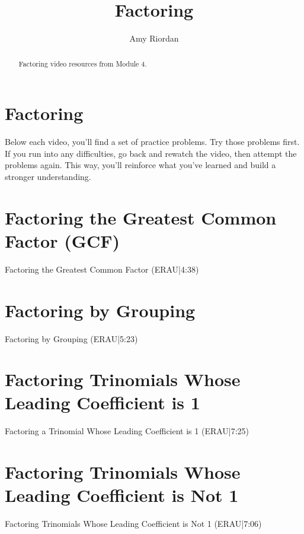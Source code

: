 \documentclass{ximera}
\title{Factoring}
\author{Amy Riordan}
\begin{document}
\begin{abstract}
Factoring video resources from Module 4.
\end{abstract}
\maketitle

\section*{Factoring}

Below each video, you’ll find a set of practice problems. Try those problems first. If you run into any difficulties, go back and rewatch the video, then attempt the problems again. This way, you’ll reinforce what you’ve learned and build a stronger understanding.

\section*{Factoring the Greatest Common Factor (GCF)}

Factoring the Greatest Common Factor (ERAU|4:38)




\section*{Factoring by Grouping}

Factoring by Grouping (ERAU|5:23)




\section*{Factoring Trinomials Whose Leading Coefficient is 1}

Factoring a Trinomial Whose Leading Coefficient is 1 (ERAU|7:25)



\section*{Factoring Trinomials Whose Leading Coefficient is Not 1}

Factoring Trinomials Whose Leading Coefficient is Not 1 (ERAU|7:06)

\end{document}
